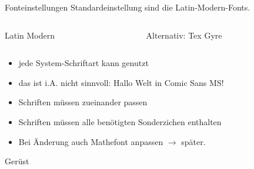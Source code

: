 \begin{frame}[fragile]{Fonteinstellungen}
    Standardeinstellung sind die Latin-Modern-Fonts. 
    \vspace{1em}
    \begin{columns}[c]
        \begin{column}{0.47\textwidth}
            \begin{block}{Latin Modern}
                \begin{lstverbatim}
                \usepackage{fontspec}
                \end{lstverbatim}
            \end{block}
        \end{column}
        \begin{column}{0.47\textwidth}
            \begin{block}{Alternativ: Tex Gyre}
                \begin{lstverbatim}
                \usepackage{fontspec}
                \setmainfont{Tex Gyre Pagella}
                \setsansfont{Tex Gyre Heros}
                \setmonofont{Tex Gyre Cursor}
                \end{lstverbatim}
            \end{block}
        \end{column}
    \end{columns}
    \begin{itemize}
        \item jede System-Schriftart kann genutzt
        \item \alert{das ist i.A. nicht sinnvoll:  Hallo Welt in Comic Sans MS! }
        \item Schriften müssen zueinander passen
        \item Schriften müssen alle benötigten Sonderzichen enthalten
        \item Bei Änderung auch Mathefont anpassen $\rightarrow$ später.
    \end{itemize}
\end{frame}


\begin{frame}[fragile]{Gerüst}
\end{frame}


